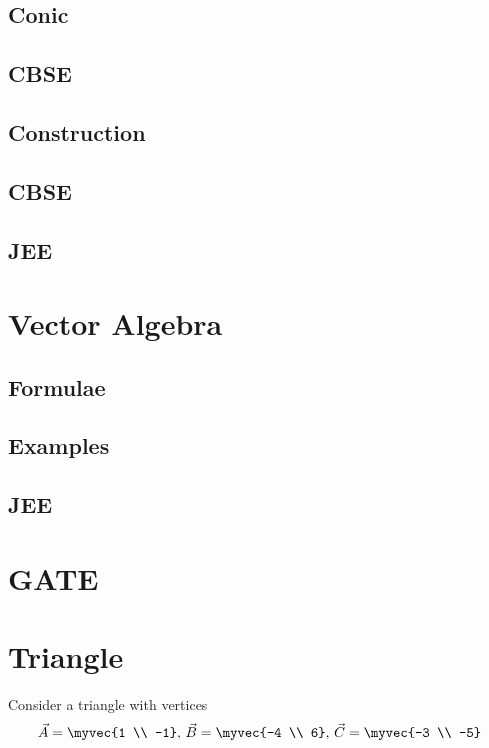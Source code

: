 \documentclass[journal]{IEEEtran}
\begin{document}
\subsection{Conic}

\subsection{CBSE}

\subsection{Construction}

\subsection{CBSE}

\subsection{JEE}
 
%
\newpage
\section{Vector Algebra}
\subsection{Formulae}

\subsection{Examples}

\subsection{JEE}
 
\newpage
\section{GATE}

\newpage
\appendices
\section{Triangle}
Consider a triangle with vertices
		\begin{align}
			\label{eq:app-tri-pts}
			\vec{A} = \myvec{1 \\ -1},\,
			\vec{B} = \myvec{-4 \\ 6},\,
			\vec{C} = \myvec{-3 \\ -5}
		\end{align}
\end{document}
